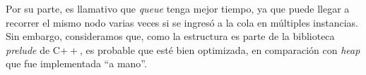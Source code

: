 Por su parte, es llamativo que \textit{queue} tenga mejor tiempo, ya que puede llegar a recorrer el mismo nodo varias veces si se ingresó a la cola en múltiples instancias. Sin embargo, consideramos que, como la estructura es parte de la biblioteca \textit{prelude} de C$++$, es probable que esté bien optimizada, en comparación con \textit{heap} que fue implementada ``a mano''.

